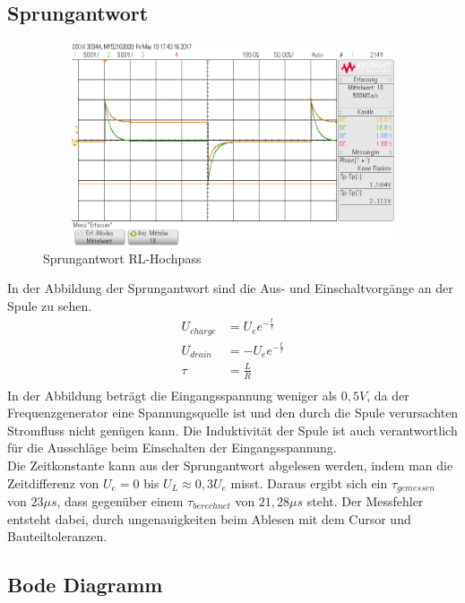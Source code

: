 \subsection{Sprungantwort}
\begin{figure}[H]
 \begin{center}
  \includegraphics[height=6cm,width=12cm]{Oszi_Bilder/RL_Sprung}
 \end{center}
 \caption{Sprungantwort RL-Hochpass}
\end{figure}
\noindent
In der Abbildung der Sprungantwort sind die Aus- und Einschaltvorgänge an der Spule zu sehen. \\
\begin{align*}
 U_{charge} &= U_e e^{-\frac{t}{\tau}}\\
 U_{drain} &= -U_e e^{-\frac{t}{\tau}}\\
 \tau &= \frac{L}{R}\\
\end{align*}
\noindent
In der Abbildung beträgt die Eingangsspannung weniger als $0,5V$, da der Frequenzgenerator eine Spannungsquelle ist und den durch die Spule verursachten Stromfluss
nicht genügen kann. Die Induktivität der Spule ist auch verantwortlich für die Ausschläge beim Einschalten der Eingangsspannung. \\
Die Zeitkonstante kann aus der Sprungantwort abgelesen werden, indem man die Zeitdifferenz von $U_e=0$ bis $U_L \approx 0,3U_e$ misst. Daraus ergibt
sich ein $\tau_{gemessen}$ von $23\mu s$, dass gegenüber einem $\tau_{berechnet}$ von $21,28\mu s$ steht. Der Messfehler entsteht dabei, durch ungenauigkeiten
beim Ablesen mit dem Cursor und Bauteiltoleranzen.\\

\subsection{Bode Diagramm}

